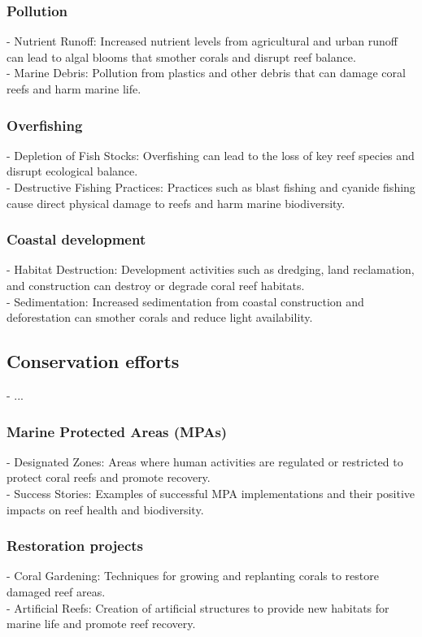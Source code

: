 \subsubsection{Pollution}
- Nutrient Runoff: Increased nutrient levels from agricultural and urban runoff can lead to algal blooms that smother corals and disrupt reef balance. \\
- Marine Debris: Pollution from plastics and other debris that can damage coral reefs and harm marine life.
\subsubsection{Overfishing}
- Depletion of Fish Stocks: Overfishing can lead to the loss of key reef species and disrupt ecological balance. \\
- Destructive Fishing Practices: Practices such as blast fishing and cyanide fishing cause direct physical damage to reefs and harm marine biodiversity. 
\subsubsection{Coastal development}
- Habitat Destruction: Development activities such as dredging, land reclamation, and construction can destroy or degrade coral reef habitats. \\
- Sedimentation: Increased sedimentation from coastal construction and deforestation can smother corals and reduce light availability.

\subsection{Conservation efforts}
- ... 
\subsubsection{Marine Protected Areas (MPAs)}
- Designated Zones: Areas where human activities are regulated or restricted to protect coral reefs and promote recovery. \\
- Success Stories: Examples of successful MPA implementations and their positive impacts on reef health and biodiversity.
\subsubsection{Restoration projects}
- Coral Gardening: Techniques for growing and replanting corals to restore damaged reef areas. \\
- Artificial Reefs: Creation of artificial structures to provide new habitats for marine life and promote reef recovery.
